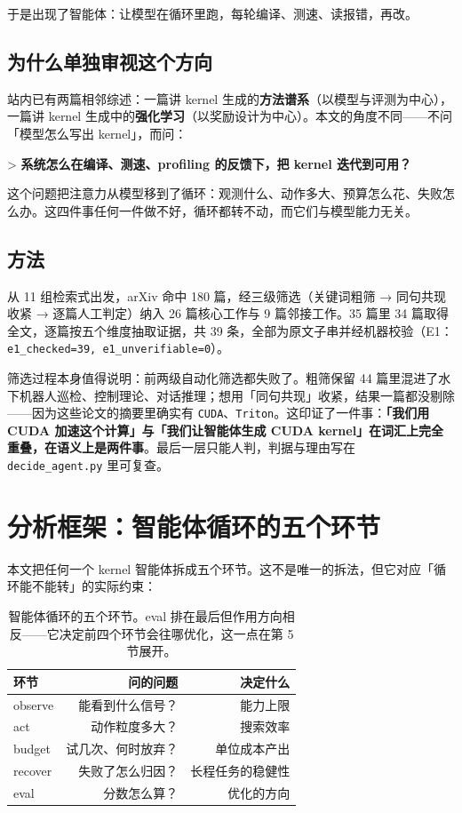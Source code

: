 于是出现了智能体：让模型在循环里跑，每轮编译、测速、读报错，再改。

\subsection{为什么单独审视这个方向}

站内已有两篇相邻综述：一篇讲 kernel 生成的\textbf{方法谱系}（以模型与评测为中心），一篇讲 kernel 生成中的\textbf{强化学习}（以奖励设计为中心）。本文的角度不同——不问「模型怎么写出 kernel」，而问：

> \textbf{系统怎么在编译、测速、profiling 的反馈下，把 kernel 迭代到可用？}

这个问题把注意力从模型移到了循环：观测什么、动作多大、预算怎么花、失败怎么办。这四件事任何一件做不好，循环都转不动，而它们与模型能力无关。

\subsection{方法}

从 11 组检索式出发，arXiv 命中 180 篇，经三级筛选（关键词粗筛 → 同句共现收紧 → 逐篇人工判定）纳入 26 篇核心工作与 9 篇邻接工作。35 篇里 34 篇取得全文，逐篇按五个维度抽取证据，共 39 条，全部为原文子串并经机器校验（E1：\texttt{e1\_checked=39, e1\_unverifiable=0}）。

筛选过程本身值得说明：前两级自动化筛选都失败了。粗筛保留 44 篇里混进了水下机器人巡检、控制理论、对话推理；想用「同句共现」收紧，结果一篇都没剔除——因为这些论文的摘要里确实有 \texttt{CUDA}、\texttt{Triton}。这印证了一件事：\textbf{「我们用 CUDA 加速这个计算」与「我们让智能体生成 CUDA kernel」在词汇上完全重叠，在语义上是两件事}。最后一层只能人判，判据与理由写在 \texttt{decide\_agent.py} 里可复查。

\section{分析框架：智能体循环的五个环节}

本文把任何一个 kernel 智能体拆成五个环节。这不是唯一的拆法，但它对应「循环能不能转」的实际约束：

\begin{table}[t]
\centering
\caption{智能体循环的五个环节。eval 排在最后但作用方向相反——它决定前四个环节会往哪优化，这一点在第 5 节展开。}
\label{tab1}
\small
\begin{tabularx}{\columnwidth}{>{\raggedright\arraybackslash}Xrr}
\toprule
环节 & 问的问题 & 决定什么 \\
\midrule
observe & 能看到什么信号？ & 能力上限 \\
act & 动作粒度多大？ & 搜索效率 \\
budget & 试几次、何时放弃？ & 单位成本产出 \\
recover & 失败了怎么归因？ & 长程任务的稳健性 \\
eval & 分数怎么算？ & 优化的方向 \\
\bottomrule
\end{tabularx}
\end{table}

